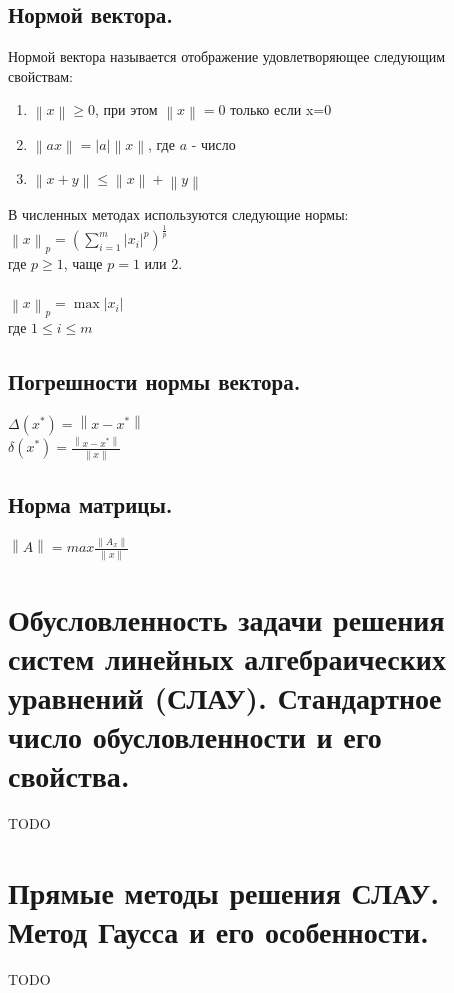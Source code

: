\documentclass[16pt]{article}
\begin{document}
            \subsection{Нормой вектора.}
            Нормой вектора называется отображение удовлетворяющее следующим свойствам:
            \begin{enumerate}
                \item{$\left\|x\right\| \geq 0$, при этом $\left\|x\right\| = 0$ только если x=0}
                \item{$\left\|ax\right\|=|a|\left\|x\right\|$, где $a$ - число}
                \item{$\left\|x+y\right\| \leq \left\|x\right\|+\left\|y\right\|$ }
            \end{enumerate}			
            В численных методах используются следующие нормы:\\
            $\left\|x\right\|_p = (\sum_{i = 1}^{m}|x_i|^p)^\frac{1}{p}$\\
            где $p \geq 1$, чаще $p = 1$ или $2$.\\ \\
            $\left\|x\right\|_p = \max|x_i|$\\
            где $1\leq i \leq m$
            \subsection{Погрешности нормы вектора.}
            $\Delta(x^{*}) = \left\|x-x^{*}\right\|$\\
            $\delta(x^{*}) = \frac{\left\|x-x^{*}\right\|}{\left\|x\right\|}$\\
            \subsection{Норма матрицы.}
            $\left\|A\right\| = max \frac{\left\|A_x\right\|}{\left\|x\right\|}$
		\section{Обусловленность задачи решения систем линейных алгебраических уравнений (СЛАУ). Стандартное число обусловленности и его свойства.}
			TODO
			
		\section{Прямые методы решения СЛАУ. Метод Гаусса и его особенности.}
			TODO
			
\end{document}
